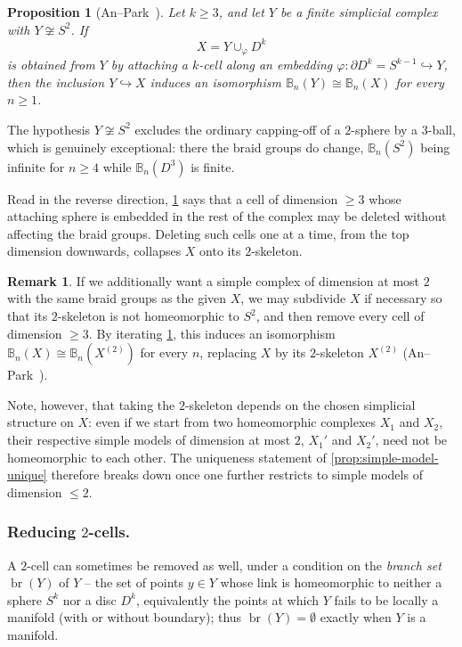 \documentclass[reqno]{amsart}
\newtheorem{proposition}[theorem]{Proposition}
\theoremstyle{definition}
\newtheorem{remark}[theorem]{Remark}
\newcommand{\BG}{\mathbb{B}}
\numberwithin{equation}{section}
\begin{document}
\begin{proposition}[{An--Park~\cite[Prop.~3.6]{AnPark2017}}]
\label{prop:reduce-higher-cells}
Let \(k\geq 3\), and let \(Y\) be a finite simplicial complex with
\(Y\not\cong S^2\). If
\[
X = Y\cup_\varphi D^k
\]
is obtained from \(Y\) by attaching a \(k\)-cell along an embedding
\(\varphi\colon\partial D^k = S^{k-1}\hookrightarrow Y\), then the
inclusion \(Y\hookrightarrow X\) induces an isomorphism \(\BG_n(Y)\cong\BG_n(X)\) for every \(n\geq 1\).
\end{proposition}

The hypothesis \(Y\not\cong S^2\) excludes the ordinary capping-off
of a \(2\)-sphere by a \(3\)-ball, which is genuinely exceptional:
there the braid groups do change, \(\BG_n(S^2)\) being infinite for
\(n\geq 4\) while \(\BG_n(D^3)\) is finite.

Read in the reverse direction,
\cref{prop:reduce-higher-cells} says that a cell of
dimension \(\geq 3\) whose attaching sphere is embedded in the rest
of the complex may be deleted without affecting the braid groups.
Deleting such cells one at a time, from the top dimension
downwards, collapses \(X\) onto its \(2\)-skeleton.

\begin{remark}\label{rem:reduce-to-dim-2}
If we additionally want a simple complex of dimension at most
\(2\) with the same braid groups as the given \(X\), we may subdivide
\(X\) if necessary so that its \(2\)-skeleton is not homeomorphic to
\(S^2\), and then remove every cell of dimension \(\geq 3\). By
iterating \cref{prop:reduce-higher-cells}, this
induces an isomorphism \(\BG_n(X)\cong\BG_n(X^{(2)})\) for every
\(n\), replacing \(X\) by its \(2\)-skeleton \(X^{(2)}\)
(An--Park~\cite[Cor.~3.8]{AnPark2017}).

Note, however, that taking the \(2\)-skeleton depends on the
chosen simplicial structure on \(X\): even if we start from two
homeomorphic complexes \(X_1\) and \(X_2\), their respective simple
models of dimension at most \(2\), \(X_1'\) and \(X_2'\), need not be
homeomorphic to each other. The uniqueness statement of
\cref{prop:simple-model-unique} therefore breaks down
once one further restricts to simple models of dimension
\(\leq 2\).
\end{remark}

\subsubsection{Reducing \(2\)-cells.}
A \(2\)-cell can sometimes be removed as well, under a condition on
the \emph{branch set} \(\operatorname{br}(Y)\) of \(Y\) -- the set of
points \(y\in Y\) whose link is homeomorphic to neither a sphere
\(S^k\) nor a disc \(D^k\), equivalently the points at which \(Y\)
fails to be locally a manifold (with or without boundary); thus
\(\operatorname{br}(Y)=\emptyset\) exactly when \(Y\) is a manifold.
\end{document}
